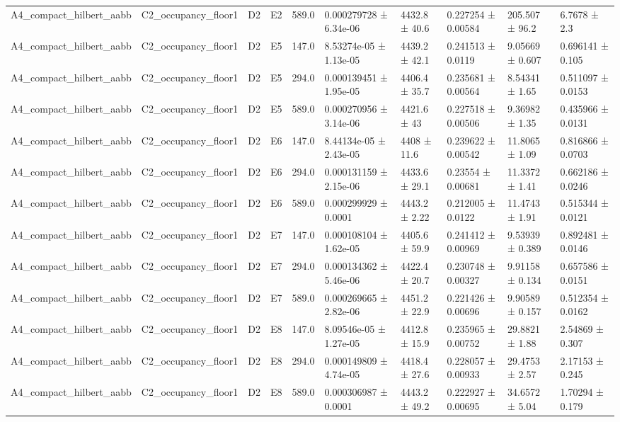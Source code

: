 \begin{table}
\begin{tabular}{llllllllll}
A4\_compact\_hilbert\_aabb & C2\_occupancy\_floor1 & D2 & E2 & 589.0 & 0.000279728 ± 6.34e-06 & 4432.8 ± 40.6 & 0.227254 ± 0.00584 & 205.507 ± 96.2 & 6.7678 ± 2.3 \\
A4\_compact\_hilbert\_aabb & C2\_occupancy\_floor1 & D2 & E5 & 147.0 & 8.53274e-05 ± 1.13e-05 & 4439.2 ± 42.1 & 0.241513 ± 0.0119 & 9.05669 ± 0.607 & 0.696141 ± 0.105 \\
A4\_compact\_hilbert\_aabb & C2\_occupancy\_floor1 & D2 & E5 & 294.0 & 0.000139451 ± 1.95e-05 & 4406.4 ± 35.7 & 0.235681 ± 0.00564 & 8.54341 ± 1.65 & 0.511097 ± 0.0153 \\
A4\_compact\_hilbert\_aabb & C2\_occupancy\_floor1 & D2 & E5 & 589.0 & 0.000270956 ± 3.14e-06 & 4421.6 ± 43 & 0.227518 ± 0.00506 & 9.36982 ± 1.35 & 0.435966 ± 0.0131 \\
A4\_compact\_hilbert\_aabb & C2\_occupancy\_floor1 & D2 & E6 & 147.0 & 8.44134e-05 ± 2.43e-05 & 4408 ± 11.6 & 0.239622 ± 0.00542 & 11.8065 ± 1.09 & 0.816866 ± 0.0703 \\
A4\_compact\_hilbert\_aabb & C2\_occupancy\_floor1 & D2 & E6 & 294.0 & 0.000131159 ± 2.15e-06 & 4433.6 ± 29.1 & 0.23554 ± 0.00681 & 11.3372 ± 1.41 & 0.662186 ± 0.0246 \\
A4\_compact\_hilbert\_aabb & C2\_occupancy\_floor1 & D2 & E6 & 589.0 & 0.000299929 ± 0.0001 & 4443.2 ± 2.22 & 0.212005 ± 0.0122 & 11.4743 ± 1.91 & 0.515344 ± 0.0121 \\
A4\_compact\_hilbert\_aabb & C2\_occupancy\_floor1 & D2 & E7 & 147.0 & 0.000108104 ± 1.62e-05 & 4405.6 ± 59.9 & 0.241412 ± 0.00969 & 9.53939 ± 0.389 & 0.892481 ± 0.0146 \\
A4\_compact\_hilbert\_aabb & C2\_occupancy\_floor1 & D2 & E7 & 294.0 & 0.000134362 ± 5.46e-06 & 4422.4 ± 20.7 & 0.230748 ± 0.00327 & 9.91158 ± 0.134 & 0.657586 ± 0.0151 \\
A4\_compact\_hilbert\_aabb & C2\_occupancy\_floor1 & D2 & E7 & 589.0 & 0.000269665 ± 2.82e-06 & 4451.2 ± 22.9 & 0.221426 ± 0.00696 & 9.90589 ± 0.157 & 0.512354 ± 0.0162 \\
A4\_compact\_hilbert\_aabb & C2\_occupancy\_floor1 & D2 & E8 & 147.0 & 8.09546e-05 ± 1.27e-05 & 4412.8 ± 15.9 & 0.235965 ± 0.00752 & 29.8821 ± 1.88 & 2.54869 ± 0.307 \\
A4\_compact\_hilbert\_aabb & C2\_occupancy\_floor1 & D2 & E8 & 294.0 & 0.000149809 ± 4.74e-05 & 4418.4 ± 27.6 & 0.228057 ± 0.00933 & 29.4753 ± 2.57 & 2.17153 ± 0.245 \\
A4\_compact\_hilbert\_aabb & C2\_occupancy\_floor1 & D2 & E8 & 589.0 & 0.000306987 ± 0.0001 & 4443.2 ± 49.2 & 0.222927 ± 0.00695 & 34.6572 ± 5.04 & 1.70294 ± 0.179 \\

\end{tabular}
\end{table}
